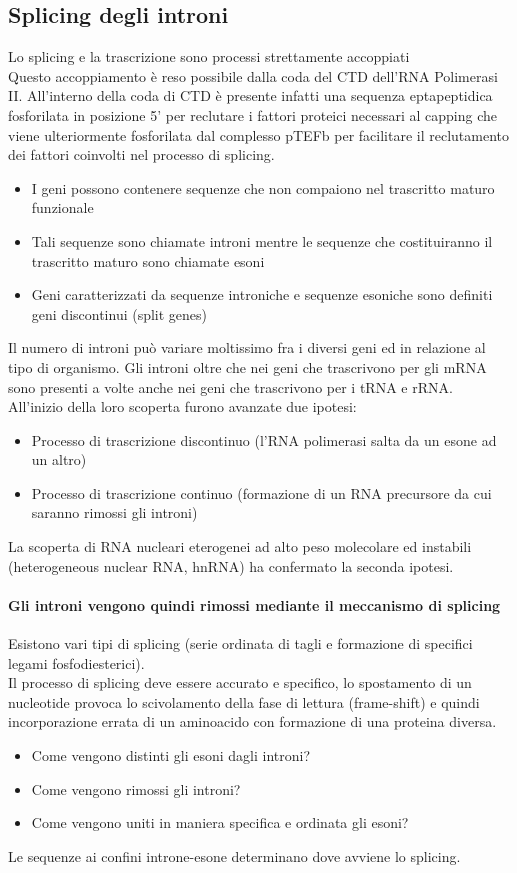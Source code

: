 \documentclass{article}
\begin{document}
\subsection{Splicing degli introni}
Lo splicing e la trascrizione sono processi strettamente accoppiati\\
Questo accoppiamento è reso possibile dalla coda del
CTD dell'RNA Polimerasi II.
All'interno della coda di CTD è presente infatti una
sequenza eptapeptidica fosforilata in posizione 5' per
reclutare i fattori proteici necessari al capping che viene
ulteriormente fosforilata dal complesso pTEFb per
facilitare il reclutamento dei fattori coinvolti nel
processo di splicing.
\begin{itemize}
    \item I geni possono contenere sequenze che non compaiono nel trascritto maturo funzionale
    \item Tali sequenze sono chiamate introni mentre le sequenze che costituiranno il trascritto maturo sono chiamate esoni
    \item Geni caratterizzati da sequenze introniche e sequenze esoniche sono definiti geni discontinui (split genes)
\end{itemize}
Il numero di introni può variare moltissimo fra i diversi geni ed in relazione al tipo di organismo.
Gli introni oltre che nei geni che trascrivono per gli mRNA sono presenti a volte anche nei geni che trascrivono per i tRNA e rRNA.\\
All'inizio della loro scoperta furono avanzate due ipotesi:
\begin{itemize}
    \item Processo di trascrizione discontinuo (l'RNA polimerasi salta da un esone ad un altro)
    \item Processo di trascrizione continuo (formazione di un RNA precursore da cui saranno rimossi gli introni)
\end{itemize}
La scoperta di RNA nucleari eterogenei ad alto peso molecolare ed instabili
(heterogeneous nuclear RNA, hnRNA) ha confermato la seconda ipotesi.
\paragraph{Gli introni vengono quindi rimossi mediante il meccanismo di splicing}
Esistono vari tipi di splicing (serie ordinata di tagli e formazione di specifici legami fosfodiesterici).\\
Il processo di splicing deve essere accurato e specifico, lo
spostamento di un nucleotide provoca lo scivolamento della
fase di lettura (frame-shift) e quindi incorporazione errata di un
aminoacido con formazione di una proteina diversa.
\begin{itemize}
    \item Come vengono distinti gli esoni dagli introni?
    \item Come vengono rimossi gli introni?
    \item Come vengono uniti in maniera specifica e ordinata gli esoni?
\end{itemize}
Le sequenze ai confini introne-esone determinano dove avviene lo splicing. 
\end{document}
